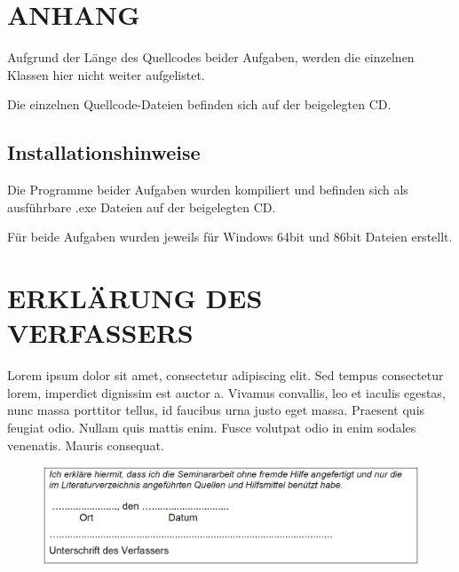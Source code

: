 \documentclass[a4paper,12pt]{article}
\begin{document}
\newpage
\section{ANHANG}
Aufgrund der Länge des Quellcodes beider Aufgaben, werden die einzelnen Klassen hier nicht weiter aufgelistet.

Die einzelnen Quellcode-Dateien befinden sich auf der beigelegten CD.

\subsection{Installationshinweise}
Die Programme beider Aufgaben wurden kompiliert und befinden sich als ausführbare .exe Dateien auf der beigelegten CD.

Für beide Aufgaben wurden jeweils für Windows 64bit und 86bit Dateien erstellt.


\newpage
\section{ERKLÄRUNG DES VERFASSERS}



Lorem ipsum dolor sit amet, consectetur adipiscing elit. Sed tempus consectetur lorem, imperdiet dignissim est auctor a. Vivamus convallis, leo et iaculis egestas, nunc massa porttitor tellus, id faucibus urna justo eget massa. Praesent quis feugiat odio. Nullam quis mattis enim. Fusce volutpat odio in enim sodales venenatis. Mauris consequat.

\begin{figure}[H]
    \includegraphics[width=\linewidth]{Bilder/Sonstiges/ErklaerungDesVerfassers.png}
\end{figure}
\end{document}

